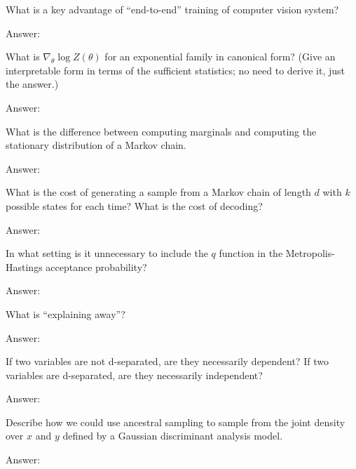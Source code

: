 \documentclass{article}
\newenvironment{answer}{\par\begingroup\color{answer}Answer: }{\endgroup}
\newcommand{\TODO}{\color{red}{TODO}}
\begin{document}
\begin{qlist}
\item What is a key advantage of ``end-to-end'' training of computer vision system?
\begin{answer}\TODO\end{answer}


\item{What is $\nabla_\theta \log Z(\theta)$ for an exponential family in canonical form? (Give an interpretable form in terms of the sufficient statistics; no need to derive it, just the answer.)}
\begin{answer}\TODO\end{answer}

\item What is the difference between computing marginals and computing the stationary distribution of a Markov chain.
\begin{answer}\TODO\end{answer}

\item What is the cost of generating a sample from a Markov chain of length $d$ with $k$ possible states for each time? What is the cost of decoding?
\begin{answer}\TODO\end{answer}

\item In what setting is it unnecessary to include the $q$ function in the Metropolis-Hastings acceptance probability?
\begin{answer}\TODO\end{answer}

\item What is ``explaining away''?
\begin{answer}\TODO\end{answer}

\item If two variables are not d-separated, are they necessarily dependent? If two variables are d-separated, are they necessarily independent?
\begin{answer}\TODO\end{answer}

\item Describe how we could use ancestral sampling to sample from the joint density over $x$ and $y$ defined by a Gaussian discriminant analysis model.
\begin{answer}\TODO\end{answer}

\end{qlist}
\end{document}
